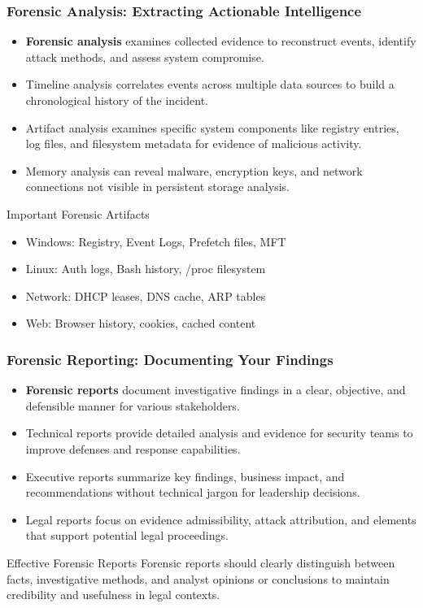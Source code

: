 \documentclass{beamer}
\begin{document}
\begin{frame}
\frametitle{Forensic Analysis: Extracting Actionable Intelligence}
\begin{itemize}
\item \textbf{Forensic analysis} examines collected evidence to reconstruct events, identify attack methods, and assess system compromise.
\item Timeline analysis correlates events across multiple data sources to build a chronological history of the incident.
\item Artifact analysis examines specific system components like registry entries, log files, and filesystem metadata for evidence of malicious activity.
\item Memory analysis can reveal malware, encryption keys, and network connections not visible in persistent storage analysis.
\end{itemize}

\begin{block}{Important Forensic Artifacts}
\scriptsize
\begin{itemize}
\item Windows: Registry, Event Logs, Prefetch files, MFT
\item Linux: Auth logs, Bash history, /proc filesystem
\item Network: DHCP leases, DNS cache, ARP tables
\item Web: Browser history, cookies, cached content
\end{itemize}
\end{block}
\end{frame}

\begin{frame}
\frametitle{Forensic Reporting: Documenting Your Findings}
\begin{itemize}
\item \textbf{Forensic reports} document investigative findings in a clear, objective, and defensible manner for various stakeholders.
\item Technical reports provide detailed analysis and evidence for security teams to improve defenses and response capabilities.
\item Executive reports summarize key findings, business impact, and recommendations without technical jargon for leadership decisions.
\item Legal reports focus on evidence admissibility, attack attribution, and elements that support potential legal proceedings.
\end{itemize}

\begin{alertblock}{Effective Forensic Reports}
\scriptsize
Forensic reports should clearly distinguish between facts, investigative methods, and analyst opinions or conclusions to maintain credibility and usefulness in legal contexts.
\end{alertblock}
\end{frame}
\end{document}
